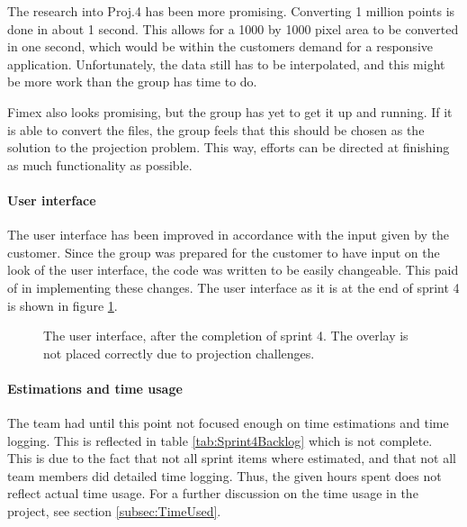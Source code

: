 \documentclass[11pt,a4paper,titlepage,oneside]{report}
\begin{document}
The research into Proj.4 has been more promising. Converting 1 million points is done in about 1 second. This allows for a 1000 by 1000 pixel area to be converted in one second, which would be within the customers demand for a responsive application. Unfortunately, the data still has to be interpolated, and this might be more work than the group has time to do.

\gls{Fimex} also looks promising, but the group has yet to get it up and running. If it is able to convert the files, the group feels that this should be chosen as the solution to the projection problem. This way, efforts can be directed at finishing as much functionality as possible. 

\paragraph{User interface}
The user interface has been improved in accordance with the input given by the customer. Since the group was prepared for the customer to have input on the look of the user interface, the code was written to be easily changeable. This paid of in implementing these changes. The user interface as it is at the end of sprint 4 is shown in figure \ref{fig:UIAfterSprint4}.

\begin{figure}[t]
\begin{center}
\caption{The user interface, after the completion of sprint 4. The overlay is not placed correctly due to projection challenges.}
\label{fig:UIAfterSprint4}
\end{center}
\end{figure}

\paragraph{Estimations and time usage}
The team had until this point not focused enough on time estimations and time logging. This is reflected in table \ref{tab:Sprint4Backlog} which is not complete. This is due to the fact that not all sprint items where estimated, and that not all team members did detailed time logging. Thus, the given hours spent does not reflect actual time usage. For a further discussion on the time usage in the project, see section \ref{subsec:TimeUsed}.
\end{document}
